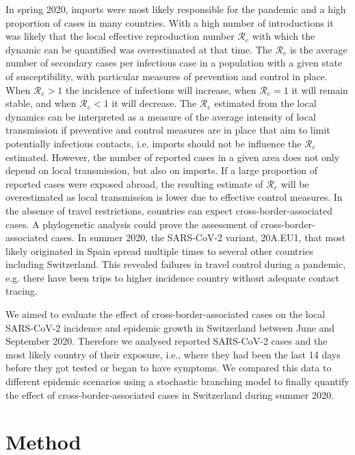 \documentclass[10pt, a4paper, twoside]{article}
\begin{document}
\begin{multicols}{2}
In spring 2020, imports were most likely responsible for the pandemic and a high proportion of cases in many countries.\cite{russell_effect_2021}
With a high number of introductions it was likely that the local effective reproduction number $\mathcal{R}_e$ with which the dynamic can be quantified was overestimated at that time.\cite{roberts_early_2011}
The $\mathcal{R}_e$ is the average number of secondary cases per infectious case in a population with a given state of susceptibility, with particular measures of prevention and control in place. 
When $\mathcal{R}_e > 1$ the incidence of infections will increase, when $\mathcal{R}_e = 1$ it will remain stable, and when $\mathcal{R}_e < 1$ it will decrease. 
The $\mathcal{R}_e$ estimated from the local dynamics can be interpreted as a measure of the average intensity of local transmission if preventive and control measures are in place that aim to limit potentially infectious contacts, i.e. imports should not be influence the $\mathcal{R}_e$ estimated.
However, the number of reported cases in a given area does not only depend on local transmission, but also on imports.
If a large proportion of reported cases were exposed abroad, the resulting estimate of $\mathcal{R}_e$ will be overestimated as local transmission is lower due to effective control measures.
In the absence of travel restrictions, countries can expect cross-border-associated cases.\cite{russell_effect_2021} 
A phylogenetic analysis could prove the assessment of cross-border-associated cases.\cite{hodcroft_emergence_2020}
In summer 2020, the SARS-CoV-2 variant, 20A.EU1, that most likely originated in Spain spread multiple times to several other countries including Switzerland.\cite{hodcroft_emergence_2020}
This revealed failures in travel control during a pandemic, e.g. there have been trips to higher incidence country without adequate contact tracing.\cite{hodcroft_emergence_2020}


We aimed to evaluate the effect of cross-border-associated cases on the local SARS-CoV-2 incidence and epidemic growth in Switzerland between June and September 2020. 
Therefore we analysed reported SARS-CoV-2 cases and the most likely country of their exposure, i.e., where they had been the last 14 days before they got tested or began to have symptoms. 
We compared this data to different epidemic scenarios using a stochastic branching model to finally quantify the effect of cross-border-associated cases in Switzerland during summer 2020.


\section{Method}


\end{multicols}
\end{document}
